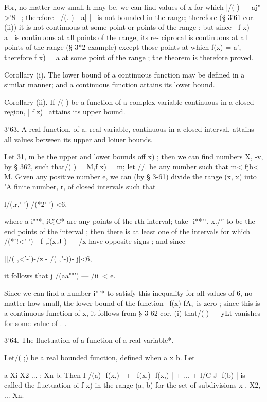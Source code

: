 For, no matter how small h may be, we can find values of x for which
|/( ) — aj" >'8~ ; therefore | /(. ) - a| |~ is not bounded in the
range; therefore (§ 3'61 cor. (ii)) it is not continuous at some point
or points of the range ; but since | f x) — a | is continuous at all
points of the range, its re- ciprocal is continuous at all points of
the range (§ 3*2 example) except those points at which f(x) = a',
therefore f x) = a at some point of the range ; the theorem is
therefore proved.

Corollary (i). The lower bound of a continuous function may be defined
in a similar manner; and a continuous function attains its lower
bound.

Corollary (ii). If /( ) be a function of a complex variable continuous
in a closed region, | f z) \ attains its upper bound.

3'63. A real function, of a. real variable, continuous in a closed
interval, attains all values between its upper and loiuer bounds.

Let 31, m be the upper and lower bounds off x) ; then we can find
numbers X, -v, by § 362, such that/( ) = M,f x) = m; let //. be any
number such that m< fjb< M. Given any positive number e, we can (by §
3-61) divide the range (x, x) into 'A finite number, r, of closed
intervals such that

l/(.r,'-')-/(*2' ')|<6,

where a i""*, iCjC* are any points of the rth interval; take -i**"',
x./'' to be the end points of the interval ; then there is at least
one of the intervals for which /(*'!<' ') - f ,f(x.J ) — /x have
opposite signs ; and since

|[/( ,<'-')-/z - /( ,"-))- j|<6,

it follows that j /(aa""') — /ii\ < e.

Since we can find a number i'''* to satisfy this inequality for all
values of 6, no matter how small, the lower bound of the function \
f(x)-fA,\ is zero ; since this is a continuous function of x, it
follows from § 3-62 cor. (i) that/( ) — yLt vanishes for some value of
. .

3'64. The fluctuation of a function of a real variable*.

Let/( ;) be a real bounded function, defined when a x b. Let

a Xi X2 ... : Xn b. Then I /(a) -f(x,) \ + \ f(x,) -f(x,) | + ... +
l/C J -f(b) | is called the fluctuation oi f x) in the range (a, b)
for the set of subdivisions x , X2, ... Xn.

